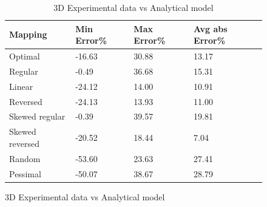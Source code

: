 \documentclass{beamer}
\begin{document}
\begin{frame}[fragile]
\begin{figure}
\caption{Analytical model effectiveness}
\begin{table}
  \caption{3D Experimental data vs Analytical model
    \label{table:data vs model 3d}}
  {\footnotesize
    \begin{tabular}{ | l | l | l | p{1.5cm} |}
    \hline
    Mapping    &    Min Error\% &    Max Error\% & Avg abs Error\%\\ \hline
    Optimal    &         -16.63 &          30.88 &         13.17\\ \hline
    Regular    &          -0.49 &          36.68 &         15.31\\ \hline
    Linear     &         -24.12 &          14.00 &         10.91\\ \hline
    Reversed   &         -24.13 &          13.93 &         11.00\\ \hline
    Skewed regular &      -0.39 &          39.57 &         19.81\\ \hline
    Skewed reversed&     -20.52 &          18.44 &          7.04\\ \hline
    Random  &            -53.60 &          23.63 &         27.41\\ \hline
    Pessimal &           -50.07 &          38.67 &         28.79\\ \hline
    \hline
    \end{tabular}
  }
\end{table}
\end{figure}
\end{frame}
\end{document}
